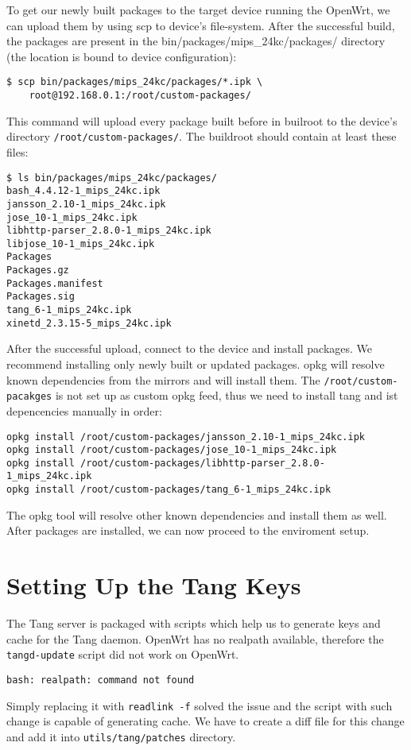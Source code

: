 To get our newly built packages to the target device running the OpenWrt, we can upload them by using scp to device's file-system.
After the successful build, the packages are present in the bin/packages/mips\_24kc/packages/ directory (the location is bound to device configuration):
\begin{lstlisting}[columns=fixed,basicstyle=\ttfamily\footnotesize,tabsize=4,backgroundcolor=\color{yellow!10}]
$ scp bin/packages/mips_24kc/packages/*.ipk \
    root@192.168.0.1:/root/custom-packages/
\end{lstlisting}
This command will upload every package built before in builroot to the device's directory {\tt /root/custom-packages/}.
The buildroot should contain at least these files:
\begin{lstlisting}[columns=fixed,basicstyle=\ttfamily\footnotesize,tabsize=4,backgroundcolor=\color{yellow!10}]
$ ls bin/packages/mips_24kc/packages/
bash_4.4.12-1_mips_24kc.ipk
jansson_2.10-1_mips_24kc.ipk
jose_10-1_mips_24kc.ipk
libhttp-parser_2.8.0-1_mips_24kc.ipk
libjose_10-1_mips_24kc.ipk
Packages
Packages.gz
Packages.manifest
Packages.sig
tang_6-1_mips_24kc.ipk
xinetd_2.3.15-5_mips_24kc.ipk
\end{lstlisting}
After the successful upload, connect to the device and install packages.
We recommend installing only newly built or updated packages.
opkg will resolve known dependencies from the mirrors and will install them.
The {\tt /root/custom-pacakges} is not set up as custom opkg feed, thus we need to install tang and ist depencencies manually in order:
\begin{lstlisting}[columns=fixed,basicstyle=\ttfamily\footnotesize,tabsize=4,backgroundcolor=\color{yellow!10}]
opkg install /root/custom-packages/jansson_2.10-1_mips_24kc.ipk
opkg install /root/custom-packages/jose_10-1_mips_24kc.ipk
opkg install /root/custom-packages/libhttp-parser_2.8.0-1_mips_24kc.ipk
opkg install /root/custom-packages/tang_6-1_mips_24kc.ipk
\end{lstlisting}
The opkg tool will resolve other known dependencies and install them as well.
After packages are installed, we can now proceed to the enviroment setup.



\section{Setting Up the Tang Keys}
The Tang server is packaged with scripts which help us to generate keys and cache for the Tang daemon.
OpenWrt has no realpath available, therefore the {\tt tangd-update} script did not work on OpenWrt.
\begin{lstlisting}[columns=fixed,basicstyle=\ttfamily\footnotesize,tabsize=4,backgroundcolor=\color{yellow!10}]
bash: realpath: command not found
\end{lstlisting}
Simply replacing it with {\tt readlink -f} solved the issue and the script with such change is capable of generating cache.
We have to create a diff file for this change and add it into {\tt utils/tang/patches} directory.

